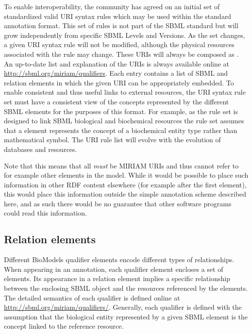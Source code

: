 To enable interoperability, the community has agreed on an initial
set of standardized valid URI syntax rules which may be used
within the standard annotation format.  This set of rules is not
part of the SBML standard but will grow independently from
specific SBML Levels and Versions.  As the set changes, a given
URI syntax rule will not be modified, although the physical
resources associated with the rule may change.  These URIs will
always be composed as .  An up-to-date list and
explanation of the URIs is always available online at
\url{http://sbml.org/miriam/qualifiers}.  Each entry contains a
list of SBML and relation elements in which the given URI can be
appropriately embedded.  To enable consistent and thus useful
links to external resources, the URI syntax rule set must have a
consistent view of the concepts represented by the different SBML
elements for the purposes of this format.  For example, as the
rule set is designed to link SBML biological and biochemical
resources the rule set assumes that a \Species element represents
the concept of a biochemical entity type rather than mathematical
symbol.  The URI rule list will evolve with the evolution of
databases and resources.

Note that this means that all  \emph{must} be
MIRIAM URIs and thus cannot refer to for example other elements in
the model.  While it would be possible to place such information
in other RDF content elsewhere (for example after the first
 element), this would place this
information outside the simple annotation scheme described here,
and as such there would be no guarantee that other software
programs could read this information.


\subsection{Relation elements}
\label{sec:qualified-dc-annotation}

Different BioModels qualifier elements encode different types of
relationships.  When appearing in an annotation, each qualifier
element encloses a set of  elements.  Its appearance
in a relation element implies a specific relationship between the
enclosing SBML object and the resources referenced by the
 elements.  The detailed semantics of each qualifier
is defined online at \url{http://sbml.org/miriam/qualifiers/}.
Generally, each qualifier is defined with the assumption that the
biological entity represented by a given SBML element is the
concept linked to the reference resource.

